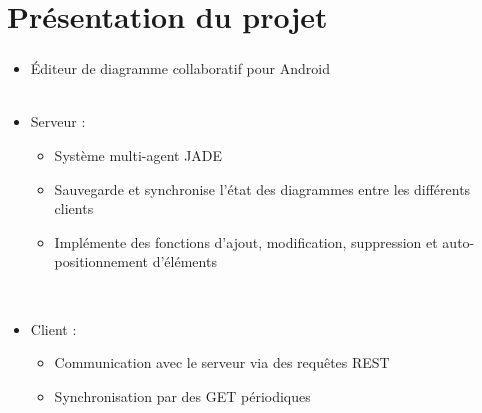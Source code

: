 \documentclass[11pt]{beamer}
\author{Jean Vintache\\Florian Impellettieri\\Charles Menier\\Marouane Hammi\\Adrien Jacquet}
\date{\today}
\begin{document}
\title{
		\hspace*{-.55cm}
}

\small
\begin{frame}
	\vspace{-0.75cm}
	\titlepage
\end{frame}


\section{Présentation du projet}
\begin{frame}
	\frametitle{\currentname}
	\begin{itemize}
		\item Éditeur de diagramme collaboratif pour Android
		\\~\\
		\item Serveur :
		\begin{itemize}
			\item Système multi-agent JADE
			\item Sauvegarde et synchronise l'état des diagrammes entre les différents clients
			\item Implémente des fonctions d'ajout, modification, suppression et auto-positionnement d'éléments
		\end{itemize}
		~\\
		\item Client :
		\begin{itemize}
			\item Communication avec le serveur via des requêtes REST
			\item Synchronisation par des GET périodiques
		\end{itemize}
	\end{itemize}
\end{frame}
\end{document}
